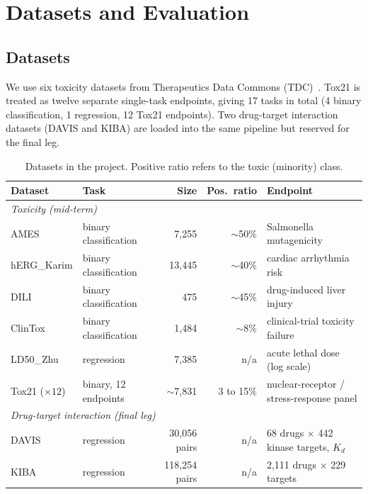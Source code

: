 \documentclass[a4paper,11pt]{article}
\begin{document}
\section{Datasets and Evaluation}

\subsection{Datasets}

We use six toxicity datasets from Therapeutics Data Commons (TDC)~\cite{huang2021}. Tox21 is treated as twelve separate single-task endpoints, giving 17 tasks in total (4 binary classification, 1 regression, 12 Tox21 endpoints). Two drug-target interaction datasets (DAVIS and KIBA) are loaded into the same pipeline but reserved for the final leg.

\begin{table}[H]
\centering
\caption{Datasets in the project. Positive ratio refers to the toxic (minority) class.}
\label{tab:datasets}
\begin{tabular}{llrrl}
\toprule
\textbf{Dataset} & \textbf{Task} & \textbf{Size} & \textbf{Pos.\ ratio} & \textbf{Endpoint} \\
\midrule
\multicolumn{5}{l}{\textit{Toxicity (mid-term)}} \\
AMES         & binary classification & 7{,}255  & $\sim$50\% & Salmonella mutagenicity \\
hERG\_Karim  & binary classification & 13{,}445 & $\sim$40\% & cardiac arrhythmia risk \\
DILI         & binary classification & 475      & $\sim$45\% & drug-induced liver injury \\
ClinTox      & binary classification & 1{,}484  & $\sim$8\%  & clinical-trial toxicity failure \\
LD50\_Zhu    & regression            & 7{,}385  & n/a        & acute lethal dose (log scale) \\
Tox21 ($\times 12$) & binary, 12 endpoints & $\sim$7{,}831 & 3 to 15\% & nuclear-receptor / stress-response panel \\
\midrule
\multicolumn{5}{l}{\textit{Drug-target interaction (final leg)}} \\
DAVIS        & regression  & 30{,}056 pairs   & n/a   & 68 drugs $\times$ 442 kinase targets, $K_d$ \\
KIBA         & regression  & 118{,}254 pairs  & n/a   & 2{,}111 drugs $\times$ 229 targets \\
\bottomrule
\end{tabular}
\end{table}
\end{document}
